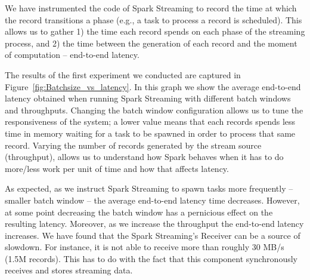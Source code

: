 We have instrumented the code of Spark Streaming to record the time at which the record transitions a phase (e.g., a task to process a record is scheduled).
This allows us to gather 1) the time each record spends on each phase of the streaming process, and 2) the time between the generation of each record and the moment of computation -- end-to-end latency.


The results of the first experiment we conducted are captured in Figure~\ref{fig:Batchsize_vs_latency}.
In this graph we show the average end-to-end latency obtained when running Spark Streaming with different batch windows and throughputs. 
Changing the batch window configuration allows us to tune the responsiveness of the system;
a lower value means that each records spends less time in memory waiting for a task to be spawned in order to process that same record. 
Varying the number of records generated by the stream source (throughput), allows us to understand how 
Spark behaves when it has to do more/less work per unit of time and how that affects latency.

As expected, as we instruct Spark Streaming to spawn tasks more frequently -- smaller batch window -- the average end-to-end latency time decreases.
However, at some point decreasing the batch window has a pernicious effect on the resulting latency.
Moreover, as we increase the throughput the end-to-end latency increases.
We have found that the Spark Streaming's Receiver can be a source of slowdown.
For instance, it is not able to receive more than roughly 30 MB/s (1.5M records).
This has to do with the fact that this component synchronously receives and stores streaming data. 
